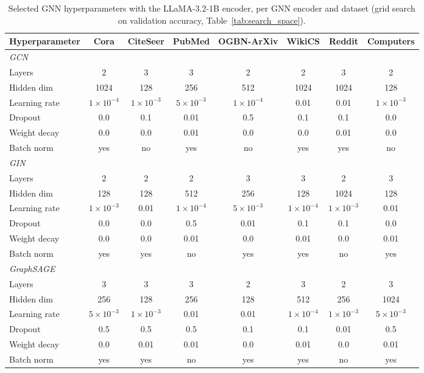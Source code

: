 \documentclass[a4paper,fleqn]{cas-sc}
\begin{document}
\begin{table}[htbp]
\centering\color{red}
\caption{Selected GNN hyperparameters with the LLaMA-3.2-1B encoder, per GNN encoder and dataset (grid search on validation accuracy, Table~\ref{tab:search_space}).}
\label{tab:gnn_hp_llama}
\footnotesize
\setlength{\tabcolsep}{3pt}
\begin{tabular*}{\textwidth}{@{\extracolsep{\fill}} lccccccc @{}}
\toprule
\textbf{Hyperparameter} & \textbf{Cora} & \textbf{CiteSeer} & \textbf{PubMed} & \textbf{OGBN-ArXiv} & \textbf{WikiCS} & \textbf{Reddit} & \textbf{Computers} \\
\midrule
\multicolumn{8}{l}{\textit{GCN}} \\
\midrule
Layers & 2 & 3 & 3 & 2 & 2 & 3 & 2 \\
Hidden dim & 1024 & 128 & 256 & 512 & 1024 & 1024 & 128 \\
Learning rate & $1\times10^{-4}$ & $1\times10^{-3}$ & $5\times10^{-3}$ & $1\times10^{-4}$ & 0.01 & 0.01 & $1\times10^{-3}$ \\
Dropout & 0.0 & 0.1 & 0.01 & 0.5 & 0.1 & 0.1 & 0.0 \\
Weight decay & 0.0 & 0.0 & 0.01 & 0.0 & 0.0 & 0.01 & 0.0 \\
Batch norm & yes & no & yes & no & yes & yes & no \\
\midrule
\multicolumn{8}{l}{\textit{GIN}} \\
\midrule
Layers & 2 & 2 & 2 & 3 & 3 & 2 & 3 \\
Hidden dim & 128 & 128 & 512 & 256 & 128 & 1024 & 128 \\
Learning rate & $1\times10^{-3}$ & 0.01 & $1\times10^{-4}$ & $5\times10^{-3}$ & $1\times10^{-4}$ & $1\times10^{-3}$ & 0.01 \\
Dropout & 0.0 & 0.0 & 0.5 & 0.01 & 0.1 & 0.1 & 0.0 \\
Weight decay & 0.0 & 0.0 & 0.01 & 0.0 & 0.01 & 0.0 & 0.01 \\
Batch norm & yes & yes & no & yes & yes & no & yes \\
\midrule
\multicolumn{8}{l}{\textit{GraphSAGE}} \\
\midrule
Layers & 3 & 3 & 3 & 2 & 3 & 2 & 3 \\
Hidden dim & 256 & 128 & 256 & 128 & 512 & 256 & 1024 \\
Learning rate & $5\times10^{-3}$ & $1\times10^{-3}$ & 0.01 & 0.01 & $1\times10^{-4}$ & $1\times10^{-3}$ & $5\times10^{-3}$ \\
Dropout & 0.5 & 0.5 & 0.5 & 0.1 & 0.1 & 0.01 & 0.5 \\
Weight decay & 0.0 & 0.01 & 0.01 & 0.0 & 0.01 & 0.0 & 0.01 \\
Batch norm & yes & yes & no & yes & yes & no & yes \\
\bottomrule
\end{tabular*}
\end{table}
\end{document}
